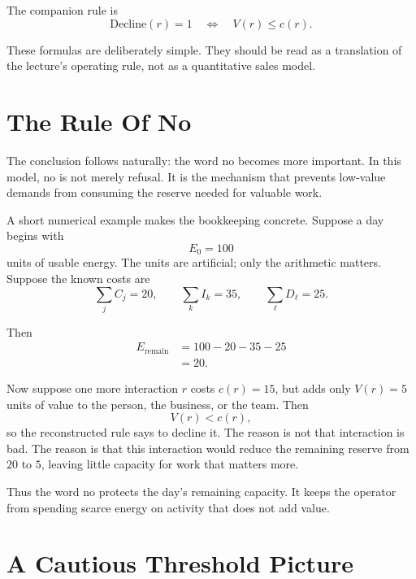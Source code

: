 The companion rule is
\begin{equation}
\mathrm{Decline}(r)=1
\quad\Longleftrightarrow\quad
V(r)\leq c(r).
\end{equation}

These formulas are deliberately simple. They should be read as a translation of the lecture's operating rule, not as a quantitative sales model.

\section{The Rule Of No}

The conclusion follows naturally: the word no becomes more important. In this model, no is not merely refusal. It is the mechanism that prevents low-value demands from consuming the reserve needed for valuable work.

A short numerical example makes the bookkeeping concrete. Suppose a day begins with
\begin{equation}
E_0=100
\end{equation}
units of usable energy. The units are artificial; only the arithmetic matters. Suppose the known costs are
\begin{equation}
\sum_j C_j=20,
\qquad
\sum_k I_k=35,
\qquad
\sum_{\ell}D_{\ell}=25.
\end{equation}

Then
\begin{align}
E_{\mathrm{remain}}
&=
100-20-35-25 \\
&=
20.
\end{align}

Now suppose one more interaction \(r\) costs \(c(r)=15\), but adds only \(V(r)=5\) units of value to the person, the business, or the team. Then
\begin{equation}
V(r)<c(r),
\end{equation}
so the reconstructed rule says to decline it. The reason is not that interaction is bad. The reason is that this interaction would reduce the remaining reserve from \(20\) to \(5\), leaving little capacity for work that matters more.

Thus the word no protects the day's remaining capacity. It keeps the operator from spending scarce energy on activity that does not add value.

\section{A Cautious Threshold Picture}

